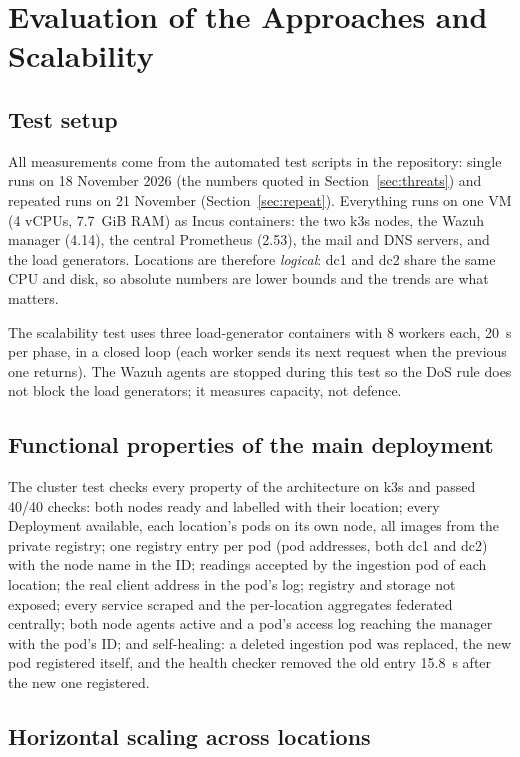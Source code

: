 \section{Evaluation of the Approaches and Scalability}
\label{sec:eval}

\subsection{Test setup}

All measurements come from the automated test scripts in the repository: single runs on 18
November 2026 (the numbers quoted in Section~\ref{sec:threats}) and repeated runs on 21 November
(Section~\ref{sec:repeat}).
Everything runs on one VM (4 vCPUs, 7.7~GiB RAM) as Incus containers: the two k3s nodes, the
Wazuh manager (4.14), the central Prometheus (2.53), the mail and DNS servers, and the load
generators. Locations are therefore \emph{logical}: dc1 and dc2 share the same CPU and disk, so
absolute numbers are lower bounds and the trends are what matters.

The scalability test uses three load-generator containers with 8 workers each, 20~s per phase, in
a closed loop (each worker sends its next request when the previous one returns). The Wazuh agents
are stopped during this test so the DoS rule does not block the load generators; it measures
capacity, not defence.

\subsection{Functional properties of the main deployment}

The cluster test checks every property of the architecture on k3s and passed 40/40 checks: both
nodes ready and labelled with their location; every Deployment available, each location's pods on
its own node, all images from the private registry; one registry entry per pod (pod addresses, both
dc1 and dc2) with the node name in the ID; readings accepted by the ingestion pod of each location;
the real client address in the pod's log; registry and storage not exposed; every service scraped
and the per-location aggregates federated centrally; both node agents active and a pod's access log
reaching the manager with the pod's ID; and self-healing: a deleted ingestion pod was replaced, the
new pod registered itself, and the health checker removed the old entry 15.8~s after the new one
registered.

\subsection{Horizontal scaling across locations}

